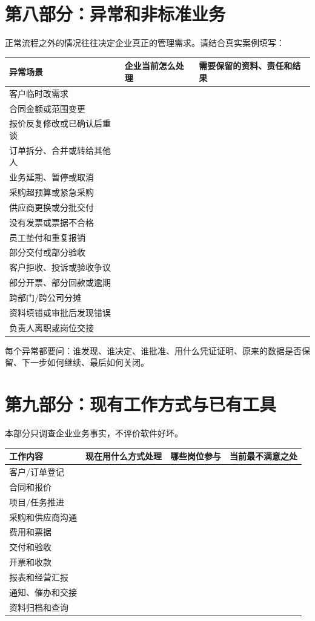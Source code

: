 \documentclass[UTF8,a4paper,11pt]{ctexart}
\begin{document}
\section{第八部分：异常和非标准业务}
正常流程之外的情况往往决定企业真正的管理需求。请结合真实案例填写：
\begin{longtable}{p{}p{}p{}}
\toprule
异常场景 & 企业当前怎么处理 & 需要保留的资料、责任和结果 \\
\midrule
客户临时改需求 & & \\
合同金额或范围变更 & & \\
报价反复修改或已确认后重谈 & & \\
订单拆分、合并或转给其他人 & & \\
业务延期、暂停或取消 & & \\
采购超预算或紧急采购 & & \\
供应商更换或分批交付 & & \\
没有发票或票据不合格 & & \\
员工垫付和重复报销 & & \\
部分交付或部分验收 & & \\
客户拒收、投诉或验收争议 & & \\
部分开票、部分回款或逾期 & & \\
跨部门/跨公司分摊 & & \\
资料填错或审批后发现错误 & & \\
负责人离职或岗位交接 & & \\
\bottomrule
\end{longtable}

每个异常都要问：谁发现、谁决定、谁批准、用什么凭证证明、原来的数据是否保留、下一步如何继续、最后如何关闭。

\section{第九部分：现有工作方式与已有工具}
本部分只调查企业业务事实，不评价软件好坏。
\begin{longtable}{p{}p{}p{}p{}}
\toprule
工作内容 & 现在用什么方式处理 & 哪些岗位参与 & 当前最不满意之处 \\
\midrule
客户/订单登记 & & & \\
合同和报价 & & & \\
项目/任务推进 & & & \\
采购和供应商沟通 & & & \\
费用和票据 & & & \\
交付和验收 & & & \\
开票和收款 & & & \\
报表和经营汇报 & & & \\
通知、催办和交接 & & & \\
资料归档和查询 & & & \\
\bottomrule
\end{longtable}
\end{document}

